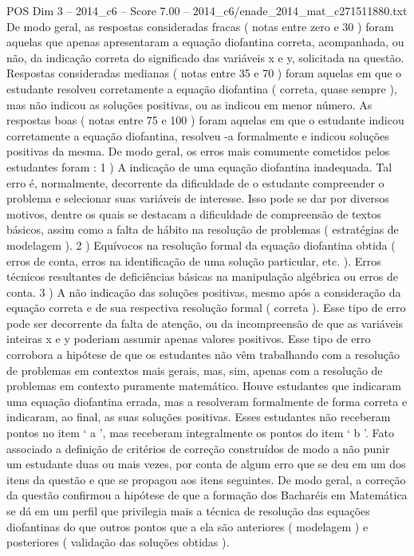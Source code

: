 \begin{textsample}{POS Dim 3 – 2014\_c6 – Score 7.00 – 2014\_c6/enade\_2014\_mat\_c271511880.txt}
De modo geral, as respostas consideradas fracas ( notas entre zero e 30 ) foram aquelas que apenas apresentaram a equação diofantina correta, acompanhada, ou não, da indicação correta do significado das variáveis x e y, solicitada na questão.
Respostas consideradas medianas ( notas entre 35 e 70 ) foram aquelas em que o estudante resolveu corretamente a equação diofantina ( correta, quase sempre ), mas não indicou as soluções positivas, ou as indicou em menor número.
As respostas boas ( notas entre 75 e 100 ) foram aquelas em que o estudante indicou corretamente a equação diofantina, resolveu -a formalmente e indicou soluções positivas da mesma.
De modo geral, os erros mais comumente cometidos pelos estudantes foram : 1 ) A indicação de uma equação diofantina inadequada.
Tal erro é, normalmente, decorrente da dificuldade de o estudante compreender o problema e selecionar suas variáveis de interesse.
Isso pode se dar por diversos motivos, dentre os quais se destacam a dificuldade de compreensão de textos básicos, assim como a falta de hábito na resolução de problemas ( estratégias de modelagem ). 2 ) Equívocos na resolução formal da equação diofantina obtida ( erros de conta, erros na identificação de uma solução particular, etc. ).
Erros técnicos resultantes de deficiências básicas na manipulação algébrica ou erros de conta. 3 ) A não indicação das soluções positivas, mesmo após a consideração da equação correta e de sua respectiva resolução formal ( correta ).
Esse tipo de erro pode ser decorrente da falta de atenção, ou da incompreensão de que as variáveis inteiras x e y poderiam assumir apenas valores positivos.
Esse tipo de erro corrobora a hipótese de que os estudantes não vêm trabalhando com a resolução de problemas em contextos mais gerais, mas, sim, apenas com a resolução de problemas em contexto puramente matemático.
Houve estudantes que indicaram uma equação diofantina errada, mas a resolveram formalmente de forma correta e indicaram, ao final, as suas soluções positivas.
Esses estudantes não receberam pontos no item ‘ a ’, mas receberam integralmente os pontos do item ‘ b ’.
Fato associado a definição de critérios de correção construídos de modo a não punir um estudante duas ou mais vezes, por conta de algum erro que se deu em um dos itens da questão e que se propagou aos itens seguintes.
De modo geral, a correção da questão confirmou a hipótese de que a formação dos Bacharéis em Matemática se dá em um perfil que privilegia mais a técnica de resolução das equações diofantinas do que outros pontos que a ela são anteriores ( modelagem ) e posteriores ( validação das soluções obtidas ).

\end{textsample}
